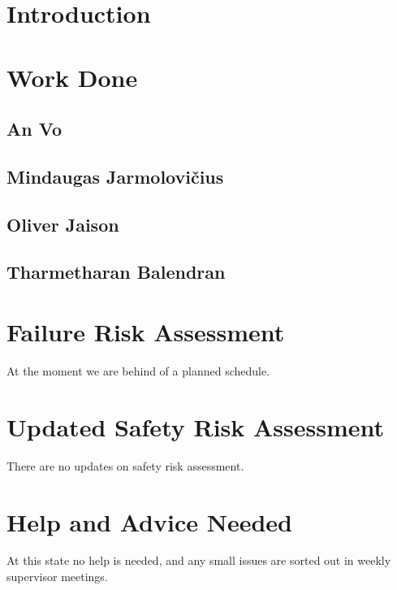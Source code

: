 \documentclass[a4paper,12pt]{article}
\begin{document}
        
	\section{Introduction}
	
	\section{Work Done}
    	\subsection{An Vo}
    	
    	
    	\subsection{Mindaugas Jarmolovi\v{c}ius}
    	
    	
    	\subsection{Oliver Jaison}
    	
    	
    	\subsection{Tharmetharan Balendran}
    	
	
	\section{Failure Risk Assessment}
	At the moment we are behind of a planned schedule.
	
	\section{Updated Safety Risk Assessment}
    There are no updates on safety risk assessment.
    
    \section{Help and Advice Needed}
    At this state no help is needed, and any small issues are sorted out in weekly supervisor meetings.
	
\end{document}
